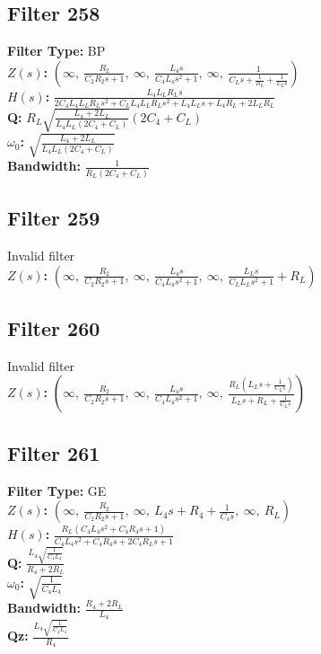 \documentclass{article}
\begin{document}
\subsection*{Filter 258}
\textbf{Filter Type:} BP \\ 
\textbf{$Z(s)$:} $\left( \infty, \  \frac{R_{2}}{C_{2} R_{2} s + 1}, \  \infty, \  \frac{L_{4} s}{C_{4} L_{4} s^{2} + 1}, \  \infty, \  \frac{1}{C_{L} s + \frac{1}{R_{L}} + \frac{1}{L_{L} s}}\right)$ \\ 
\textbf{$H(s)$:} $\frac{L_{4} L_{L} R_{L} s}{2 C_{4} L_{4} L_{L} R_{L} s^{2} + C_{L} L_{4} L_{L} R_{L} s^{2} + L_{4} L_{L} s + L_{4} R_{L} + 2 L_{L} R_{L}}$ \\ 
\textbf{Q:} $R_{L} \sqrt{\frac{L_{4} + 2 L_{L}}{L_{4} L_{L} \left(2 C_{4} + C_{L}\right)}} \left(2 C_{4} + C_{L}\right)$ \\ 
\textbf{$\omega_0$:} $\sqrt{\frac{L_{4} + 2 L_{L}}{L_{4} L_{L} \left(2 C_{4} + C_{L}\right)}}$ \\ 
\textbf{Bandwidth:} $\frac{1}{R_{L} \left(2 C_{4} + C_{L}\right)}$ \\ 
\subsection*{Filter 259}
Invalid filter \\ 
\textbf{$Z(s)$:} $\left( \infty, \  \frac{R_{2}}{C_{2} R_{2} s + 1}, \  \infty, \  \frac{L_{4} s}{C_{4} L_{4} s^{2} + 1}, \  \infty, \  \frac{L_{L} s}{C_{L} L_{L} s^{2} + 1} + R_{L}\right)$ \\ 
\subsection*{Filter 260}
Invalid filter \\ 
\textbf{$Z(s)$:} $\left( \infty, \  \frac{R_{2}}{C_{2} R_{2} s + 1}, \  \infty, \  \frac{L_{4} s}{C_{4} L_{4} s^{2} + 1}, \  \infty, \  \frac{R_{L} \left(L_{L} s + \frac{1}{C_{L} s}\right)}{L_{L} s + R_{L} + \frac{1}{C_{L} s}}\right)$ \\ 
\subsection*{Filter 261}
\textbf{Filter Type:} GE \\ 
\textbf{$Z(s)$:} $\left( \infty, \  \frac{R_{2}}{C_{2} R_{2} s + 1}, \  \infty, \  L_{4} s + R_{4} + \frac{1}{C_{4} s}, \  \infty, \  R_{L}\right)$ \\ 
\textbf{$H(s)$:} $\frac{R_{L} \left(C_{4} L_{4} s^{2} + C_{4} R_{4} s + 1\right)}{C_{4} L_{4} s^{2} + C_{4} R_{4} s + 2 C_{4} R_{L} s + 1}$ \\ 
\textbf{Q:} $\frac{L_{4} \sqrt{\frac{1}{C_{4} L_{4}}}}{R_{4} + 2 R_{L}}$ \\ 
\textbf{$\omega_0$:} $\sqrt{\frac{1}{C_{4} L_{4}}}$ \\ 
\textbf{Bandwidth:} $\frac{R_{4} + 2 R_{L}}{L_{4}}$ \\ 
\textbf{Qz:} $\frac{L_{4} \sqrt{\frac{1}{C_{4} L_{4}}}}{R_{4}}$ \\ 
\end{document}
